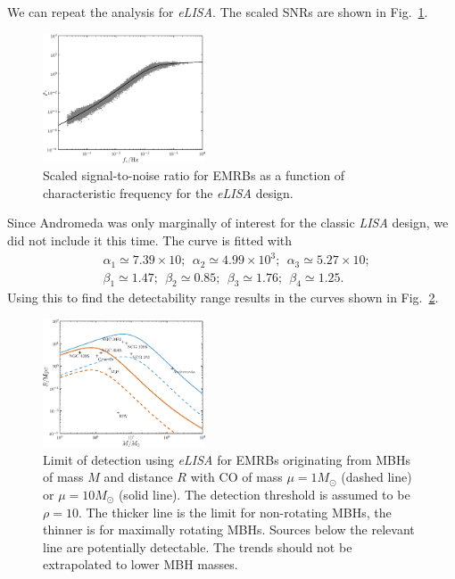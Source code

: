 \documentclass[useAMS,usedcolumn,usegraphicx,usenatbib]{mn2e}
\newcommand{\figref}[1]{Fig.~\ref{fig:#1}}
\begin{document}
We can repeat the analysis for \textit{eLISA}. The scaled SNRs are shown in \figref{scaled-SNR-eLISA}.
\begin{figure}
\begin{center}
 \includegraphics[width=0.43\textwidth]{Fig_SNR_scaled_fit_eLISA}
 \caption{Scaled signal-to-noise ratio for EMRBs as a function of characteristic frequency for the \textit{eLISA} design.\label{fig:scaled-SNR-eLISA}}
   \end{center}
\end{figure}
Since Andromeda was only marginally of interest for the classic \textit{LISA} design, we did not include it this time. The curve is fitted with
\begin{equation}
\begin{split}
&\alpha_1 \simeq 7.39 \times 10; \ \ \alpha_2 \simeq 4.99 \times 10^3; \ \ \alpha_3 \simeq 5.27 \times 10;\\
&\beta_1 \simeq 1.47; \ \ \beta_2 \simeq 0.85; \ \ \beta_3 \simeq 1.76; \ \ \beta_4 \simeq 1.25.
\end{split}
\end{equation}
Using this to find the detectability range results in the curves shown in \figref{detect-eLISA}.
\begin{figure}
\begin{center}
 \includegraphics[width=0.43\textwidth]{Fig_M_R_detect_2}
 \caption{Limit of detection using \textit{eLISA} for EMRBs originating from MBHs of mass $M$ and distance $R$ with CO of mass $\mu = 1 M_\odot$ (dashed line) or $\mu = 10 M_\odot$ (solid line). The detection threshold is assumed to be $\rho = 10$. The thicker line is the limit for non-rotating MBHs, the thinner is for maximally rotating MBHs. Sources below the relevant line are potentially detectable. The trends should not be extrapolated to lower MBH masses.\label{fig:detect-eLISA}}
   \end{center}
\end{figure}
\end{document}
